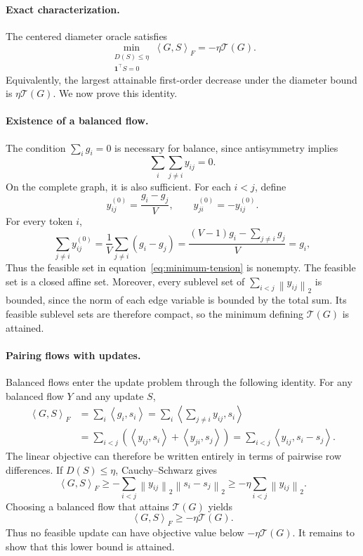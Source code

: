 \documentclass[anon]{opt2026} %
\newcommand{\one}{\mathbf{1}}
\newcommand{\norm}[1]{\left\lVert #1\right\rVert}
\newcommand{\inner}[2]{\left\langle #1,#2\right\rangle}
\begin{document}
\paragraph{Exact characterization.}
The centered diameter oracle satisfies
\begin{equation}
\boxed{
\min_{\substack{D(S)\leq\eta\\\one^\top S=0}}
\inner{G}{S}_F
=
-\eta\mathcal T(G).
}
\label{eq:diameter-flow-duality}
\end{equation}
Equivalently, the largest attainable first-order decrease under the diameter
bound is $\eta\mathcal T(G)$. We now prove this identity.


\paragraph{Existence of a balanced flow.}
The condition $\sum_i g_i=0$ is necessary for balance, since antisymmetry
implies
\[
\sum_i\sum_{j\neq i}y_{ij}=0.
\]
On the complete graph, it is also sufficient. For each $i<j$, define
\[
y_{ij}^{(0)}=\frac{g_i-g_j}{V},
\qquad
y_{ji}^{(0)}=-y_{ij}^{(0)}.
\]
For every token $i$,
\[
\sum_{j\neq i}y_{ij}^{(0)}
=
\frac{1}{V}\sum_{j\neq i}(g_i-g_j)
=
\frac{(V-1)g_i-\sum_{j\neq i}g_j}{V}
=
g_i,
\]
Thus the feasible set in equation~\ref{eq:minimum-tension} is nonempty. The feasible set is a closed affine set. Moreover, every sublevel set of $\sum_{i<j}\norm{y_{ij}}_2$ is bounded, since the norm of each edge variable is bounded by the total sum. Its feasible sublevel sets are therefore compact, so the minimum defining $\mathcal T(G)$ is attained.


\paragraph{Pairing flows with updates.}
Balanced flows enter the update problem through the following identity. For
any balanced flow $Y$ and any update $S$,
\begin{equation}
\begin{aligned}
\inner{G}{S}_F
&=
\sum_i\inner{g_i}{s_i}
=
\sum_i
\inner{\sum_{j\neq i}y_{ij}}{s_i} \\
&=
\sum_{i<j}
\left(
\inner{y_{ij}}{s_i}
+
\inner{y_{ji}}{s_j}
\right)
=
\sum_{i<j}\inner{y_{ij}}{s_i-s_j}.
\end{aligned}
\label{eq:flow-pairing}
\end{equation}
The linear objective can therefore be written entirely in terms of pairwise
row differences. If $D(S)\leq\eta$, Cauchy--Schwarz gives
\[
\inner{G}{S}_F
\geq
-\sum_{i<j}
\norm{y_{ij}}_2\norm{s_i-s_j}_2
\geq
-\eta\sum_{i<j}\norm{y_{ij}}_2.
\]
Choosing a balanced flow that attains $\mathcal T(G)$ yields
\[
\inner{G}{S}_F\geq-\eta\mathcal T(G).
\]
Thus no feasible update can have objective value below
$-\eta\mathcal T(G)$. It remains to show that this lower bound is attained.
\end{document}
